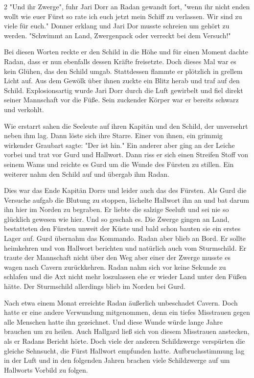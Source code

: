 \documentclass[10pt, a4paper, oneside]{book}
\begin{document}
\begin{multicols}{2}
"Und ihr Zwerge", fuhr Jari Dorr an Radan gewandt fort, "wenn ihr nicht enden wollt wie euer Fürst so rate ich euch jetzt mein Schiff zu verlassen. Wir sind zu viele für euch." Donner erklang und Jari Dor musste schreien um gehört zu werden.  "Schwimmt an Land, Zwergenpack oder verreckt bei dem Versuch!"\bigskip

Bei diesen Worten reckte er den Schild in die Höhe und für einen Moment dachte Radan, dass er nun ebenfalls dessen Kräfte freisetzte. Doch dieses Mal war es kein Glühen, das den Schild umgab. Stattdessen flammte er plötzlich in grellem Licht auf. Aus dem Gewölk über ihnen zuckte ein Blitz herab und traf auf den Schild. Explosionsartig wurde Jari Dorr durch die Luft gewirbelt und fiel direkt seiner Mannschaft vor die Füße. Sein zuckender Körper war er bereits schwarz und verkohlt.\bigskip

Wie erstarrt sahen die Seeleute auf ihren Kapitän und den Schild, der unversehrt neben ihm lag. Dann löste sich ihre Starre. Einer von ihnen, ein grimmig wirkender Graubart sagte: "Der ist hin." Ein anderer aber ging an der Leiche vorbei und trat vor Gurd und Hallwort. Dann riss er sich einen Streifen Stoff von seinem Wams und reichte es Gurd um die Wunde des Fürsten zu stillen. Ein weiterer nahm den Schild auf und übergab ihm Radan.\bigskip

Dies war das Ende Kapitän Dorrs und leider auch das des Fürsten. Als Gurd die Versuche aufgab die Blutung zu stoppen, lächelte Hallwort ihn an und bat darum ihn hier im Norden zu begraben. Er liebte die salzige Seeluft und sei nie so glücklich gewesen wie hier. Und so geschah es. Die Zwerge gingen an Land, bestatteten den Fürsten unweit der Küste und bald schon bauten sie ein erstes Lager auf. Gurd übernahm das Kommando. Radan aber blieb an Bord. Er sollte heimkehren und von Hallwort berichten und natürlich auch vom Sturmschild. Er traute der Mannschaft nicht über den Weg aber einer der Zwerge musste es wagen nach Cavern zurückkehren. Radan nahm sich vor keine Sekunde zu schlafen und die Axt nicht mehr loszulassen ehe er wieder Land unter den Füßen hätte. Der Sturmschild allerdings  blieb im Norden bei Gurd.\bigskip

Nach etwa einem Monat erreichte Radan äußerlich unbeschadet Cavern. Doch hatte er eine andere Verwundung mitgenommen, denn ein tiefes Misstrauen gegen alle Menschen hatte ihn gezeichnet. Und diese Wunde würde lange Jahre brauchen um zu heilen. Auch Hallgard ließ sich von diesem Misstrauen anstecken, als er Radans Bericht hörte. Doch viele der anderen Schildzwerge verspürten die gleiche Sehnsucht, die Fürst Hallwort empfunden hatte. Aufbruchsstimmung lag in der Luft und in den folgenden Jahren brachen viele Schildzwerge auf um Hallworts Vorbild zu folgen.\bigskip


\end{multicols}
\end{document}

